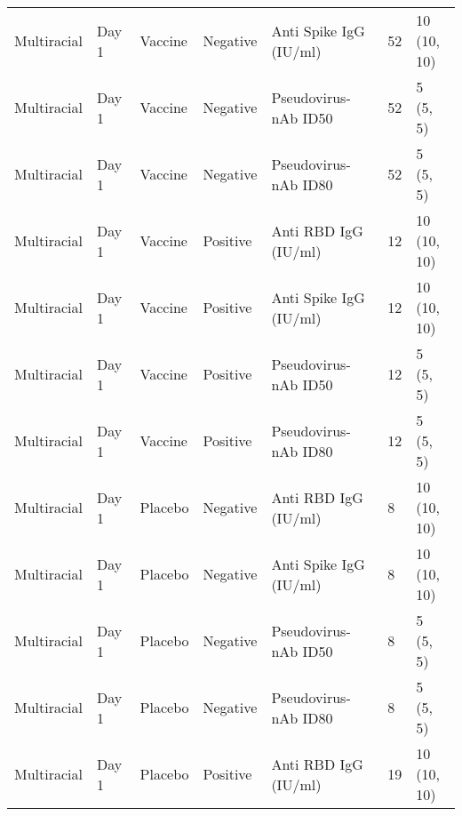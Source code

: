 \documentclass[]{book}
\theoremstyle{definition}
\theoremstyle{definition}
\theoremstyle{definition}
\newcommand{\1}{\mathbbm{1}}
\begin{document}
\begin{landscape}
\begin{ThreePartTable}
\begin{longtable}[t]{>{\raggedright\arraybackslash}p{7cm}llllll}
\hspace{1em}Multiracial & Day 1 & Vaccine & Negative & Anti Spike IgG (IU/ml) & 52 & \makecell[l]{10\\(10, 10)}\\
\hspace{1em}Multiracial & Day 1 & Vaccine & Negative & Pseudovirus-nAb ID50 & 52 & \makecell[l]{5\\(5, 5)}\\
\hspace{1em}Multiracial & Day 1 & Vaccine & Negative & Pseudovirus-nAb ID80 & 52 & \makecell[l]{5\\(5, 5)}\\
\hspace{1em}Multiracial & Day 1 & Vaccine & Positive & Anti RBD IgG (IU/ml) & 12 & \makecell[l]{10\\(10, 10)}\\
\hspace{1em}Multiracial & Day 1 & Vaccine & Positive & Anti Spike IgG (IU/ml) & 12 & \makecell[l]{10\\(10, 10)}\\
\hspace{1em}Multiracial & Day 1 & Vaccine & Positive & Pseudovirus-nAb ID50 & 12 & \makecell[l]{5\\(5, 5)}\\
\hspace{1em}Multiracial & Day 1 & Vaccine & Positive & Pseudovirus-nAb ID80 & 12 & \makecell[l]{5\\(5, 5)}\\
\hspace{1em}Multiracial & Day 1 & Placebo & Negative & Anti RBD IgG (IU/ml) & 8 & \makecell[l]{10\\(10, 10)}\\
\hspace{1em}Multiracial & Day 1 & Placebo & Negative & Anti Spike IgG (IU/ml) & 8 & \makecell[l]{10\\(10, 10)}\\
\hspace{1em}Multiracial & Day 1 & Placebo & Negative & Pseudovirus-nAb ID50 & 8 & \makecell[l]{5\\(5, 5)}\\
\hspace{1em}Multiracial & Day 1 & Placebo & Negative & Pseudovirus-nAb ID80 & 8 & \makecell[l]{5\\(5, 5)}\\
\hspace{1em}Multiracial & Day 1 & Placebo & Positive & Anti RBD IgG (IU/ml) & 19 & \makecell[l]{10\\(10, 10)}\\

\end{longtable}
\end{ThreePartTable}
\end{landscape}
\end{document}
